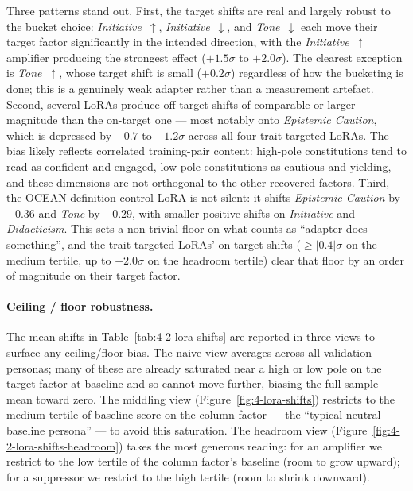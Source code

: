 Three patterns stand out.
First, the target shifts are real and largely robust to the bucket choice: \textit{Initiative}~$\uparrow$, \textit{Initiative}~$\downarrow$, and \textit{Tone}~$\downarrow$ each move their target factor significantly in the intended direction, with the \textit{Initiative}~$\uparrow$ amplifier producing the strongest effect ($+1.5\sigma$ to $+2.0\sigma$). The clearest exception is \textit{Tone}~$\uparrow$, whose target shift is small ($+0.2\sigma$) regardless of how the bucketing is done; this is a genuinely weak adapter rather than a measurement artefact.
Second, several LoRAs produce off-target shifts of comparable or larger magnitude than the on-target one --- most notably onto \textit{Epistemic Caution}, which is depressed by $-0.7$ to $-1.2\sigma$ across all four trait-targeted LoRAs. The bias likely reflects correlated training-pair content: high-pole constitutions tend to read as confident-and-engaged, low-pole constitutions as cautious-and-yielding, and these dimensions are not orthogonal to the other recovered factors.
Third, the OCEAN-definition control LoRA is not silent: it shifts \textit{Epistemic Caution} by $-0.36$ and \textit{Tone} by $-0.29$, with smaller positive shifts on \textit{Initiative} and \textit{Didacticism}. This sets a non-trivial floor on what counts as ``adapter does something'', and the trait-targeted LoRAs' on-target shifts ($\geq |0.4|\sigma$ on the medium tertile, up to $+2.0\sigma$ on the headroom tertile) clear that floor by an order of magnitude on their target factor.

\paragraph{Ceiling / floor robustness.}
The mean shifts in Table~\ref{tab:4-2-lora-shifts} are reported in three views to surface any ceiling/floor bias.
The naive view averages across all validation personas; many of these are already saturated near a high or low pole on the target factor at baseline and so cannot move further, biasing the full-sample mean toward zero.
The middling view (Figure~\ref{fig:4-lora-shifts}) restricts to the medium tertile of baseline score on the column factor --- the ``typical neutral-baseline persona'' --- to avoid this saturation.
The headroom view (Figure~\ref{fig:4-2-lora-shifts-headroom}) takes the most generous reading: for an amplifier we restrict to the low tertile of the column factor's baseline (room to grow upward); for a suppressor we restrict to the high tertile (room to shrink downward).

